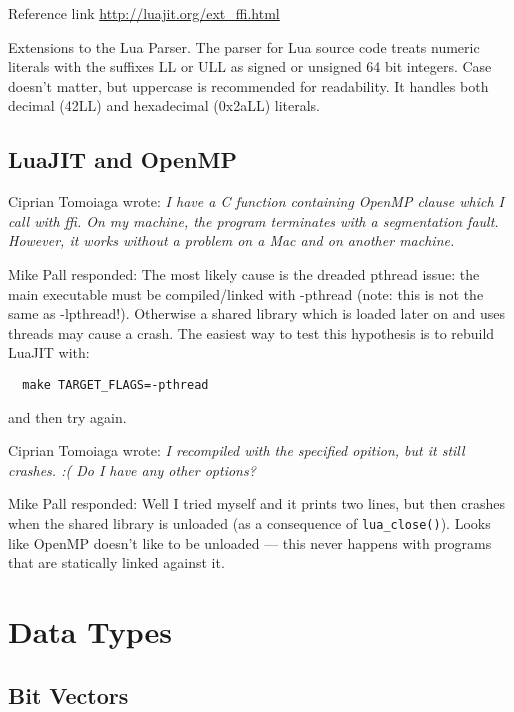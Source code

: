 Reference link \url{http://luajit.org/ext_ffi.html}

Extensions to the Lua Parser. 
The parser for Lua source code treats numeric literals with the suffixes LL
or ULL as signed or unsigned 64 bit integers. Case doesn't matter, but
uppercase is recommended for readability. It handles both decimal (42LL)
and hexadecimal (0x2aLL) literals.



\subsection{LuaJIT and OpenMP}

Ciprian Tomoiaga wrote:
{\it I have a C function containing OpenMP clause which I call with ffi. On my
machine, the program terminates with a segmentation fault. However, it
works without a problem on a Mac and on another machine. }

Mike Pall responded: 
The most likely cause is the dreaded pthread issue: the main
executable must be compiled/linked with -pthread (note: this is
not the same as -lpthread!). Otherwise a shared library which is
loaded later on and uses threads may cause a crash.
The easiest way to test this hypothesis is to rebuild LuaJIT with:
\begin{verbatim}
  make TARGET_FLAGS=-pthread
\end{verbatim}
and then try again.

Ciprian Tomoiaga wrote:
{\it I recompiled with the specified opition, but it still crashes. :(
Do I have any other options? }

Mike Pall responded: 
Well I tried myself and it prints two lines, but then crashes when
the shared library is unloaded (as a consequence of \verb+lua_close()+).
Looks like OpenMP doesn't like to be unloaded --- this never
happens with programs that are statically linked against it.


\section{Data Types}

\subsection{Bit Vectors}
